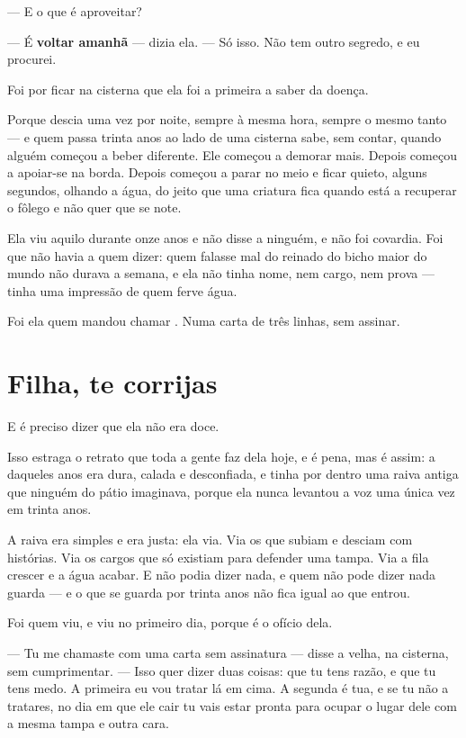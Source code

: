 \documentclass[livro.tex]{subfiles}
\begin{document}
--- E o que é aproveitar?

--- É \textbf{voltar amanhã} --- dizia ela. --- Só isso. Não tem outro segredo, e eu procurei.

\medskip

Foi por ficar na cisterna que ela foi a primeira a saber da doença.

Porque \Ven descia uma vez por noite, sempre à mesma hora, sempre o mesmo tanto --- e quem passa
trinta anos ao lado de uma cisterna sabe, sem contar, quando alguém começou a beber diferente.
Ele começou a demorar mais. Depois começou a apoiar-se na borda. Depois começou a parar no meio
e ficar quieto, alguns segundos, olhando a água, do jeito que uma criatura fica quando está a
recuperar o fôlego e não quer que se note.

Ela viu aquilo durante onze anos e não disse a ninguém, e não foi covardia. Foi que não havia a
quem dizer: quem falasse mal do reinado do bicho maior do mundo não durava a semana, e ela não
tinha nome, nem cargo, nem prova --- tinha uma impressão de quem ferve água.

Foi ela quem mandou chamar \Qui . Numa carta de três linhas, sem assinar.

\section{Filha, te corrijas}

E é preciso dizer que ela não era doce.

Isso estraga o retrato que toda a gente faz dela hoje, e é pena, mas é assim: a \Lua daqueles
anos era dura, calada e desconfiada, e tinha por dentro uma raiva antiga que ninguém do pátio
imaginava, porque ela nunca levantou a voz uma única vez em trinta anos.

A raiva era simples e era justa: ela via. Via os que subiam e desciam com histórias. Via os
cargos que só existiam para defender uma tampa. Via a fila crescer e a água acabar. E não podia
dizer nada, e quem não pode dizer nada guarda --- e o que se guarda por trinta anos não fica
igual ao que entrou.

\medskip

Foi \Qui quem viu, e viu no primeiro dia, porque é o ofício dela.

--- Tu me chamaste com uma carta sem assinatura --- disse a velha, na cisterna, sem cumprimentar.
--- Isso quer dizer duas coisas: que tu tens razão, e que tu tens medo. A primeira eu vou tratar
lá em cima. A segunda é tua, e se tu não a tratares, no dia em que ele cair tu vais estar pronta
para ocupar o lugar dele com a mesma tampa e outra cara.
\end{document}
